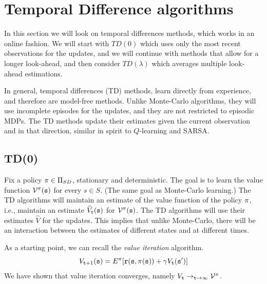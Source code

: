 \section{Temporal Difference algorithms}
\label{sec:TD}



In this section we will look on temporal differences methods, which
works in an online fashion. We will start with $TD(0)$ which uses
only the most recent observations for the updates, and we will
continue with methods that allow for a longer look-ahead, and then
consider $TD(\lambda)$ which averages multiple look-ahead
estimations.

In general, temporal differences (TD) methods, learn directly from
experience, and therefore are model-free methods. Unlike Monte-Carlo
algorithms, they will use incomplete episodes for the updates, and
they are not restricted to episodic MDPs. The TD methods update
their estimates given the current observation and in that direction,
similar in spirit to $Q$-learning and SARSA.

\subsection{TD(0)}

Fix a policy $\pi\in \Pi_{SD}$, stationary and deterministic. The goal
is to learn the value function $\mathcal{V}^\pi({\tt s})$ for every
$s\in S$. (The same goal as Monte-Carlo learning.) The TD algorithms
will maintain an estimate of the value function of the policy
$\pi$, i.e., maintain an estimate $\widehat{V}_{\tt t}({\tt s})$
for $\mathcal{V}^\pi({\tt s})$. The TD algorithms will use their
estimates $\widehat{V}$ for the updates. This implies that unlike
Monte-Carlo, there will be an interaction between the estimates of
different states and at different times.

As a starting point, we can recall the {\em value iteration}
algorithm.
\[
V_{{\tt t}+1}({\tt s})=E^\pi[{\tt r}({\tt s},\pi({\tt s}))+\gamma
V_{\tt t}({\tt s}')]
\]
We have shown that value iteration converges, namely $V_{\tt t}
\rightarrow_{{\tt t}\rightarrow\infty} \mathcal{V}^\pi$.


